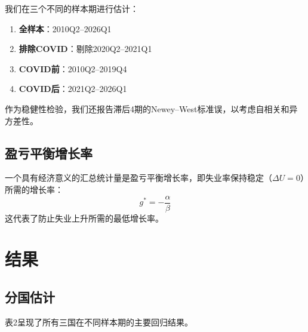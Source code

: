 \documentclass[12pt,a4paper,UTF8]{ctexart}
\begin{document}
我们在三个不同的样本期进行估计：
\begin{enumerate}
    \item \textbf{全样本}：2010Q2--2026Q1
    \item \textbf{排除COVID}：剔除2020Q2--2021Q1
    \item \textbf{COVID前}：2010Q2--2019Q4
    \item \textbf{COVID后}：2021Q2--2026Q1
\end{enumerate}

作为稳健性检验，我们还报告滞后4期的Newey--West标准误，以考虑自相关和异方差性。

\subsection{盈亏平衡增长率}

一个具有经济意义的汇总统计量是盈亏平衡增长率，即失业率保持稳定（$\Delta U = 0$）所需的增长率：
\[
g^* = -\frac{\alpha}{\beta}
\]
这代表了防止失业上升所需的最低增长率。

\section{结果}

\subsection{分国估计}

表2呈现了所有三国在不同样本期的主要回归结果。
\end{document}
